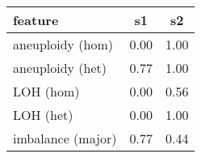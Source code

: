 \documentclass{standalone}
\begin{document}
\begin{tabular}{|l|c|c|}
\toprule
\textbf{feature} & s1 & s2 \\
\midrule
aneuploidy (hom) & 0.00 & 1.00 \\
aneuploidy (het) & 0.77 & 1.00 \\
LOH (hom) & 0.00 & 0.56 \\
LOH (het) & 0.00 & 1.00 \\
imbalance (major) & 0.77 & 0.44 \\
\bottomrule
\end{tabular}
\end{document}
